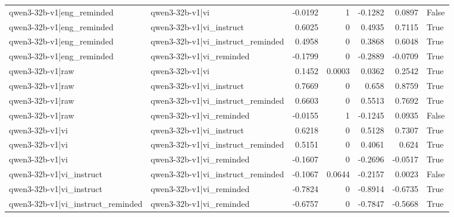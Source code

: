 \begin{table}
\begin{tabular}{l l r r r r l}
qwen3-32b-v1|eng_reminded & qwen3-32b-v1|vi & -0.0192 & 1 & -0.1282 & 0.0897 & False \\
qwen3-32b-v1|eng_reminded & qwen3-32b-v1|vi_instruct & 0.6025 & 0 & 0.4935 & 0.7115 & True \\
qwen3-32b-v1|eng_reminded & qwen3-32b-v1|vi_instruct_reminded & 0.4958 & 0 & 0.3868 & 0.6048 & True \\
qwen3-32b-v1|eng_reminded & qwen3-32b-v1|vi_reminded & -0.1799 & 0 & -0.2889 & -0.0709 & True \\
qwen3-32b-v1|raw & qwen3-32b-v1|vi & 0.1452 & 0.0003 & 0.0362 & 0.2542 & True \\
qwen3-32b-v1|raw & qwen3-32b-v1|vi_instruct & 0.7669 & 0 & 0.658 & 0.8759 & True \\
qwen3-32b-v1|raw & qwen3-32b-v1|vi_instruct_reminded & 0.6603 & 0 & 0.5513 & 0.7692 & True \\
qwen3-32b-v1|raw & qwen3-32b-v1|vi_reminded & -0.0155 & 1 & -0.1245 & 0.0935 & False \\
qwen3-32b-v1|vi & qwen3-32b-v1|vi_instruct & 0.6218 & 0 & 0.5128 & 0.7307 & True \\
qwen3-32b-v1|vi & qwen3-32b-v1|vi_instruct_reminded & 0.5151 & 0 & 0.4061 & 0.624 & True \\
qwen3-32b-v1|vi & qwen3-32b-v1|vi_reminded & -0.1607 & 0 & -0.2696 & -0.0517 & True \\
qwen3-32b-v1|vi_instruct & qwen3-32b-v1|vi_instruct_reminded & -0.1067 & 0.0644 & -0.2157 & 0.0023 & False \\
qwen3-32b-v1|vi_instruct & qwen3-32b-v1|vi_reminded & -0.7824 & 0 & -0.8914 & -0.6735 & True \\
qwen3-32b-v1|vi_instruct_reminded & qwen3-32b-v1|vi_reminded & -0.6757 & 0 & -0.7847 & -0.5668 & True \\
\bottomrule
\end{tabular}
\end{table}
